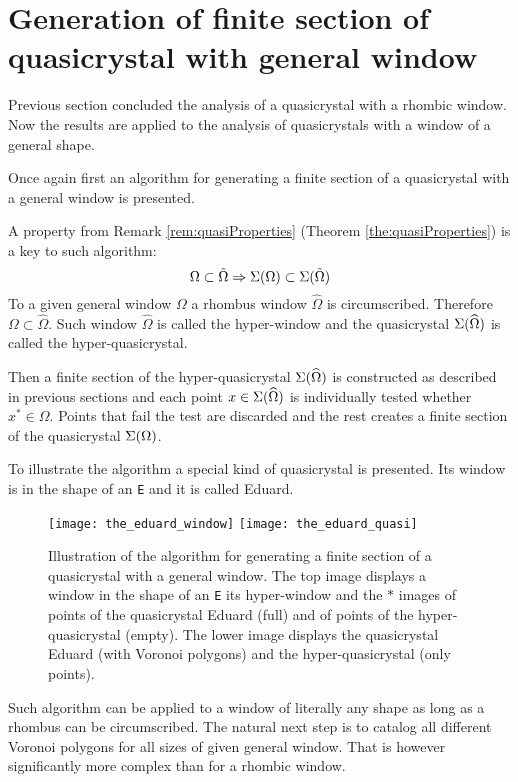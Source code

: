 \documentclass[text.tex]{subfiles}
\begin{document}
\pagestyle{plain}
\section{Generation of finite section of quasicrystal with general window}
Previous section concluded the analysis of a quasicrystal with a rhombic window. Now the results are applied to the analysis of quasicrystals with a window of a general shape. 

Once again first an algorithm for generating a finite section of a quasicrystal with a general window is presented.

A property from Remark \ref{rem:quasiProperties} (Theorem \ref{the:quasiProperties}) is a key to such algorithm:
$$\Omega \subset \tilde{\Omega} \Rightarrow \Sigma(\Omega) \subset \Sigma(\tilde{\Omega})$$
To a given general window $\Omega$ a rhombus window $\widehat{\Omega}$ is circumscribed. Therefore $\Omega\subset\widehat{\Omega}$. Such window $\widehat{\Omega}$ is called the hyper-window and the quasicrystal $\Sigma(\widehat{\Omega})$ is called the hyper-quasicrystal. 

Then a finite section of the hyper-quasicrystal $\Sigma(\widehat{\Omega})$ is constructed as described in previous sections and each point $x\in\Sigma(\widehat{\Omega})$ is individually tested whether $x^\ast\in\Omega$. Points that fail the test are discarded and the rest creates a finite section of the quasicrystal $\Sigma(\Omega)$.

To illustrate the algorithm a special kind of quasicrystal is presented. Its window is in the shape of an \texttt{E} and it is called Eduard.
\begin{figure}[h!]
\centering
\texttt{[image: the\_eduard\_window]}
\texttt{[image: the\_eduard\_quasi]}
\caption{Illustration of the algorithm for generating a finite section of a quasicrystal with a general window. The top image displays a window in the shape of an \texttt{E} its hyper-window and the $\ast$ images of points of the quasicrystal Eduard (full) and of points of the hyper-quasicrystal (empty). The lower image displays the quasicrystal Eduard (with Voronoi polygons) and the hyper-quasicrystal (only points).}
\end{figure}

Such algorithm can be applied to a window of literally any shape as long as a rhombus can be circumscribed. The natural next step is to catalog all different Voronoi polygons for all sizes of given general window. That is however significantly more complex than for a rhombic window.
\end{document}
